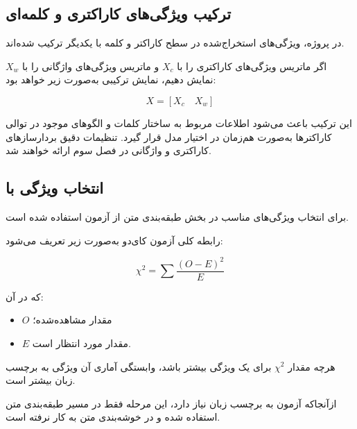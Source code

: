 \documentclass[12pt,a4paper,oneside]{report}
\begin{document}
\subsection{ترکیب ویژگی‌های کاراکتری و کلمه‌ای}

در پروژه، ویژگی‌های استخراج‌شده در سطح کاراکتر و کلمه با یکدیگر ترکیب شده‌اند.

اگر ماتریس ویژگی‌های کاراکتری را با $X_c$ و ماتریس ویژگی‌های واژگانی را با $X_w$ نمایش دهیم، نمایش ترکیبی به‌صورت زیر خواهد بود:

\begin{equation}
X=
\left[
X_c
\quad
X_w
\right]
\end{equation}

این ترکیب باعث می‌شود اطلاعات مربوط به ساختار کلمات و الگوهای موجود در توالی کاراکترها به‌صورت هم‌زمان در اختیار مدل قرار گیرد. تنظیمات دقیق بردارسازهای کاراکتری و واژگانی در فصل سوم ارائه خواهند شد.


\subsection{انتخاب ویژگی با }

برای انتخاب ویژگی‌های مناسب در بخش طبقه‌بندی متن از آزمون
استفاده شده است.

رابطه کلی آزمون کای‌دو به‌صورت زیر تعریف می‌شود:

\begin{equation}
\chi^2
=
\sum
\frac{(O-E)^2}{E}
\end{equation}

که در آن:

\begin{itemize}

	\item $O$ مقدار مشاهده‌شده؛

	\item $E$ مقدار مورد انتظار است.

\end{itemize}

هرچه مقدار
$\chi^2$
برای یک ویژگی بیشتر باشد، وابستگی آماری آن ویژگی به برچسب زبان بیشتر است.

ازآنجاکه آزمون
به برچسب زبان نیاز دارد، این مرحله فقط در مسیر طبقه‌بندی متن استفاده شده و در خوشه‌بندی متن به کار نرفته است.
\end{document}
